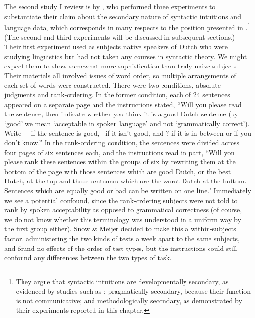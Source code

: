 The second study I review is by \citet{SnowEtAl1977}, who performed three experiments to substantiate their claim about the secondary nature of syntactic intuitions and language data, which corresponds in many respects to the position presented in .\footnote{They argue that syntactic intuitions are developmentally secondary, as evidenced by studies such as \citet{Hakes1980}; pragmatically secondary, because their function is not communicative; and methodologically secondary, as demonstrated by their experiments reported in this chapter.}
 (The second and third experiments will be discussed in subsequent sections.) Their first experiment used as subjects native speakers of Dutch who were studying linguistics but had not taken any courses in syntactic theory. We might expect them to show somewhat more sophistication than truly naive subjects. Their materials all involved issues of word order, so multiple arrangements of each set of words were constructed. There were two conditions, absolute judgments and rank-ordering. In the former condition, each of 24 sentences appeared on a separate page and the instructions stated, ``Will you please read the sentence, then indicate whether you think it is a good Dutch sentence (by `good' we mean `acceptable in spoken language' and not `grammatically correct'). Write + if the sentence is good, \textminus~if it isn't good,
and ? if it is in-between or if you don't know.'' In the rank-ordering condition, the sentences were divided across four pages of six sentences each, and the instructions read in part, ``Will you please rank these sentences within the groups of six by rewriting them at the bottom of the page with those sentences which are good Dutch, or the best Dutch, at the top and those sentences which are the worst Dutch at the bottom. Sentences which are equally good or bad can be written on one line.'' Immediately we see a potential confound, since the rank-ordering subjects were not told to rank by spoken acceptability as opposed to grammatical correctness (of course, we do not know whether this terminology was understood in a uniform way by the first group either). Snow \& Meijer decided to make this a within-subjects
factor, administering the two kinds of tests a week apart to the same subjects, and found no effects of the order of test types, but the instructions could still confound any differences between the two types of task.


